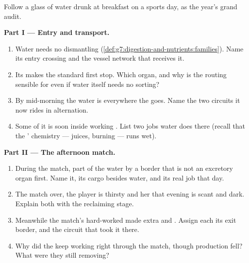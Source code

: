 \begin{problem}\label{pb:g7:removing-wastes:1}
Follow a glass of water drunk at breakfast on a sports
day, as the year's grand audit.

\medskip\noindent\textbf{Part I --- Entry and transport.}
\begin{enumerate}
  \item Water needs no dismantling
        (\cref{def:g7:digestion-and-nutrients:families}).
        Name its entry crossing and the vessel network
        that receives it.
  \item Its  makes the standard first stop. Which
        organ, and why is the routing sensible for
         even if water itself needs no sorting?
  \item By mid-morning the water is everywhere the 
        goes. Name the two circuits it now rides in
        alternation.
  \item Some of it is soon inside working . List
        two jobs water does there (recall that the
        ' chemistry --- juices, burning --- runs
        wet).
\end{enumerate}

\medskip\noindent\textbf{Part II --- The afternoon
match.}
\begin{enumerate}[resume]
  \item During the match, part of the water  by a
        border that is not an excretory organ first.
        Name it, its cargo besides water, and its real
        job that day.
  \item The match over, the player is thirsty and her
         that evening is scant and dark. Explain
        both with the reclaiming stage.
  \item Meanwhile the match's hard-worked  made
        extra  and . Assign each its
        exit border, and the circuit  that took it
        there.
  \item Why did the  keep working right through
        the match, though  production fell? What
        were they still removing?
\end{enumerate}


\end{problem}
